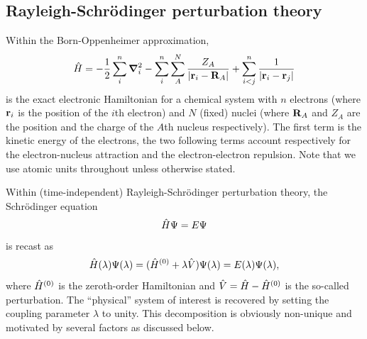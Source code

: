 \documentclass[11pt,a4paper]{article}
\newcommand{\hH}{\Hat{H}}
\newcommand{\hV}{\Hat{V}}
\begin{document}
\subsection{Rayleigh-Schr\"odinger perturbation theory}

Within the Born-Oppenheimer approximation, 
\begin{equation}\label{eq:ExactHamiltonian}
    \hH = - \frac{1}{2} \sum_{i}^{n} \grad_i^2 - \sum_{i}^{n} \sum_{A}^{N} \frac{Z_A}{\abs{\vb{r}_i-\vb{R}_A}} + \sum_{i<j}^{n}\frac{1}{\abs{\vb{r}_i-\vb{r}_j}}
\end{equation}
is the exact electronic Hamiltonian for a chemical system with $n$ electrons (where $\vb{r}_i$ is the position of the $i$th electron) and $N$ (fixed) nuclei (where $\vb{R}_A$ and $Z_A$ are the position and the charge of the $A$th nucleus respectively). 
The first term is the kinetic energy of the electrons, the two following terms account respectively for the electron-nucleus attraction and the electron-electron repulsion.
Note that we use atomic units throughout unless otherwise stated.

Within (time-independent) Rayleigh-Schr\"odinger perturbation theory, the Schr\"odinger equation 
\begin{equation} \label{eq:SchrEq}
	\hH \Psi = E \Psi
\end{equation} 
is recast as 
\begin{equation} \label{eq:SchrEq-PT}
	\hH(\lambda) \Psi(\lambda) = (\hH^{(0)} + \lambda \hV ) \Psi(\lambda) = E(\lambda) \Psi(\lambda),
\end{equation}
where $\hH^{(0)}$ is the zeroth-order Hamiltonian and $\hV = \hH - \hH^{(0)}$ is the so-called perturbation.
The ``physical'' system of interest is recovered by setting the coupling parameter $\lambda$ to unity.
This decomposition is obviously non-unique and motivated by several factors as discussed below.
\end{document}

